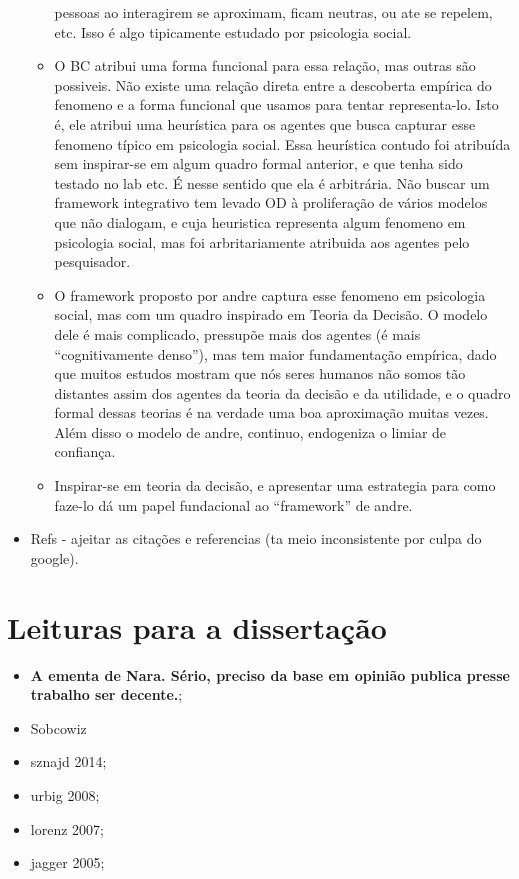 \documentclass{article}
\begin{document}
\begin{itemize}
\begin{itemize}
    pessoas ao interagirem se aproximam, ficam neutras, ou ate se repelem, etc.
    Isso é algo tipicamente estudado por psicologia social.
  \item O BC atribui uma forma funcional para essa relação, mas outras são
    possiveis. Não existe uma relação direta entre a descoberta empírica do
    fenomeno e a forma funcional que usamos para tentar representa-lo. Isto é,
    ele atribui uma heurística para os agentes que busca capturar esse fenomeno
    típico em psicologia social. Essa heurística contudo foi atribuída sem
    inspirar-se em algum quadro formal anterior, e que tenha sido testado no lab
    etc. É nesse sentido que ela é arbitrária. Não buscar um framework
    integrativo tem levado OD à proliferação de vários modelos que não dialogam,
    e cuja heuristica representa algum fenomeno em psicologia social, mas foi
    arbritariamente atribuida aos agentes pelo pesquisador.
  \item O framework proposto por andre captura esse fenomeno em psicologia
    social, mas com um quadro inspirado em Teoria da Decisão.  O modelo dele é
    mais complicado, pressupõe mais dos agentes (é mais ``cognitivamente
    denso''), mas tem maior fundamentação empírica, dado que muitos estudos
    mostram que nós seres humanos não somos tão distantes assim dos agentes da
    teoria da decisão e da utilidade, e o quadro formal dessas teorias é na
    verdade uma boa aproximação muitas vezes. Além disso o modelo de andre,
    continuo, endogeniza o limiar de confiança.
  \item Inspirar-se em teoria da decisão, e apresentar uma estrategia para como
    faze-lo dá um papel fundacional ao ``framework'' de andre.
  \end{itemize}
\item {\Large Refs - ajeitar as citações e referencias (ta meio inconsistente
    por culpa do google)}.

\end{itemize}

\section*{Leituras para a dissertação}

\begin{itemize}
\item {\Large \textbf{A ementa de Nara. Sério, preciso da base em opinião
      publica presse trabalho ser decente.};}
\item Sobcowiz
\item sznajd 2014;
\item urbig 2008; 
\item lorenz 2007;
\item jagger 2005;
\end{itemize}
\end{document}
